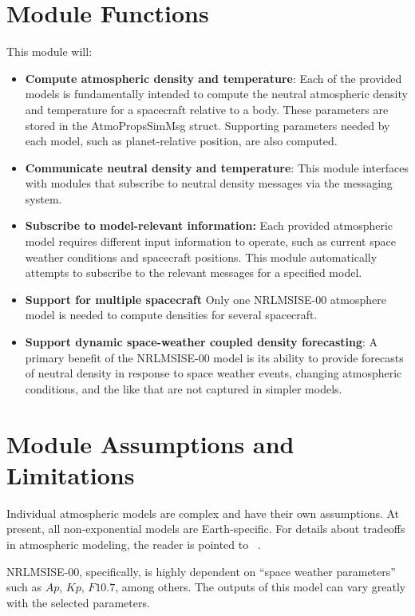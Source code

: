 

\section{Module Functions}
This module will:
\begin{itemize}
	\item \textbf{Compute atmospheric density and temperature}: Each of the provided models is fundamentally intended to compute the neutral atmospheric density and temperature for a spacecraft relative to a body. These parameters are stored in the AtmoPropsSimMsg struct. Supporting parameters needed by each model, such as planet-relative position, are also computed.
	\item \textbf{Communicate neutral density and temperature}: This module interfaces with modules that subscribe to neutral density messages via the messaging system.
	\item \textbf {Subscribe to model-relevant information:} Each provided atmospheric model requires different input information to operate, such as current space weather conditions and spacecraft positions. This module automatically attempts to subscribe to the relevant messages for a specified model. 
	\item \textbf{Support for multiple spacecraft} Only one NRLMSISE-00 atmosphere model is needed to compute densities for several spacecraft.
	\item \textbf{Support dynamic space-weather coupled density forecasting}: A primary benefit of the NRLMSISE-00 model is its ability to provide forecasts of neutral density in response to space weather events, changing atmospheric conditions, and the like that are not captured in simpler models.
\end{itemize}

\section{Module Assumptions and Limitations}
Individual atmospheric models are complex and have their own assumptions. At present, all non-exponential models are Earth-specific. For details about tradeoffs in atmospheric modeling, the reader is pointed to ~. 

NRLMSISE-00, specifically, is highly dependent on ``space weather parameters'' such as $Ap$, $Kp$, $F10.7$, among others. The outputs of this model can vary greatly with the selected parameters.